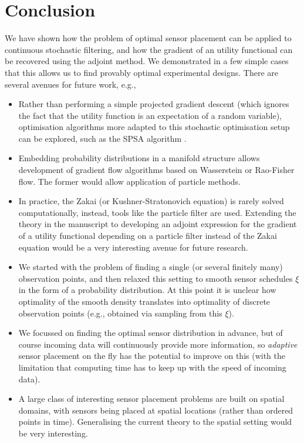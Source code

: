 \documentclass[10pt]{article}
\numberwithin{equation}{section}
\numberwithin{figure}{section}
\theoremstyle{remark}
\begin{document}
\section{Conclusion}\label{sec:conclusion}
We have shown how the problem of optimal sensor placement can be applied to continuous stochastic filtering, and how the gradient of an utility functional can be recovered using the adjoint method. We demonstrated in a few simple cases that this allows us to find provably optimal experimental designs. There are several avenues for future work, e.g.,
\begin{itemize}
    \item Rather than performing a simple projected gradient descent (which ignores the fact that the utility function is an expectation of a random variable), optimisation algorithms more adapted to this stochastic optimisation setup can be explored, such as the SPSA algorithm \cite{spall1987stochastic}.
    \item Embedding probability distributions in a manifold structure allows development of gradient flow algorithms based on Wasserstein or Rao-Fisher flow. The former would allow application of particle methods.
    \item In practice, the Zakai (or Kushner-Stratonovich equation) is rarely solved computationally, instead, tools like the particle filter are used. Extending the theory in the manuscript to developing an adjoint expression for the gradient of a utility functional depending on a particle filter instead of the Zakai equation would be a very interesting avenue for future research.
    \item We started with the problem of finding a single (or several finitely many) observation points, and then relaxed this setting to smooth sensor schedules $\xi$ in the form of a probability distribution. At this point it is unclear how optimality of the smooth density translates into optimality of discrete observation points (e.g., obtained via sampling from this $\xi$).
    \item We focussed on finding the optimal sensor distribution in advance, but of course incoming data will continuously provide more information, so \textit{adaptive} sensor placement on the fly has the potential to improve on this (with the limitation that computing time has to keep up with the speed of incoming data).
    \item A large class of interesting sensor placement problems are built on spatial domains, with sensors being placed at spatial locations (rather than ordered points in time). Generalising the current theory to the spatial setting would be very interesting.
\end{itemize}
\end{document}
